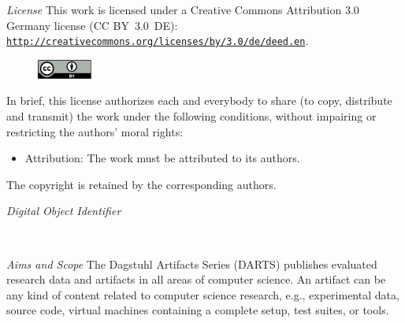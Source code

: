 \documentclass[a4paper,UKenglish]{dartsmaster}
\begin{document}
\begin{publicationinfo}

\bigskip

\emph{License}\newline
This work is licensed under a Creative Commons Attribution 3.0 Germany license (CC BY~3.0~DE): \href{http://creativecommons.org/licenses/by/3.0/de/deed.en}{\nolinkurl{http://creativecommons.org/licenses/by/}}\linebreak \href{http://creativecommons.org/licenses/by/3.0/de/deed.en}{\nolinkurl{3.0/de/deed.en}}.
\begin{figure}
\vspace*{-1\baselineskip}
\includegraphics[width=1.8cm]{cc-by}
\end{figure} 
In brief, this license authorizes each and everybody to share (to
copy, distribute and transmit) the work under the following
conditions, without impairing or restricting the authors'
moral rights:
\begin{itemize}
\item Attribution: The work must be attributed to its authors.
\end{itemize}

The copyright is retained by the corresponding authors.

\vfill
\emph{Digital Object Identifier}\newline
\printForewordDOI

\newpage

~~

\bigskip

\emph{Aims and Scope}\newline
The Dagstuhl Artifacts Series (DARTS) publishes evaluated research data and artifacts in all areas of computer science. An artifact can be any kind of content related to computer science research, e.g., experimental data, source code, virtual machines containing a complete setup, test suites, or tools.



\end{publicationinfo}
\end{document}
